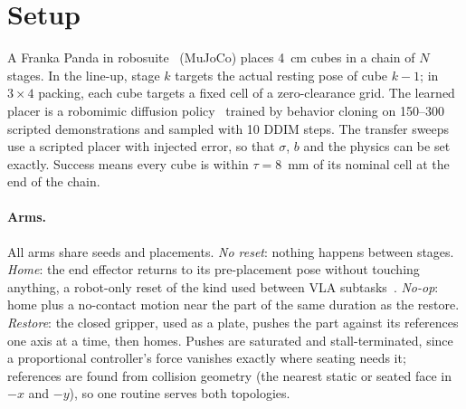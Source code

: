 \documentclass{article}
\begin{document}
\section{Setup}
\label{sec:setup}
A Franka Panda in robosuite~\citep{robosuite} (MuJoCo) places 4~cm cubes in a chain of $N$ stages. In the line-up,
stage $k$ targets the actual resting pose of cube $k-1$; in $3\times4$ packing, each cube targets a fixed cell of a
zero-clearance grid. The learned placer is a robomimic diffusion policy~\citep{robomimic,diffusionpolicy} trained by
behavior cloning on 150--300 scripted demonstrations and sampled with 10 DDIM steps. The transfer sweeps use a
scripted placer with injected error, so that $\sigma$, $b$ and the physics can be set exactly. Success means every
cube is within $\tau=8$~mm of its nominal cell at the end of the chain.

\paragraph{Arms.} All arms share seeds and placements. \textit{No reset}: nothing happens between stages.
\textit{Home}: the end effector returns to its pre-placement pose without touching anything, a robot-only reset of the
kind used between VLA subtasks~\citep{baton2026}. \textit{No-op}: home plus a no-contact motion near the part of the
same duration as the restore. \textit{Restore}: the closed gripper, used as a plate, pushes the part against its
references one axis at a time, then homes. Pushes are saturated and stall-terminated, since a proportional
controller's force vanishes exactly where seating needs it; references are found from collision geometry (the
nearest static or seated face in $-x$ and $-y$), so one routine serves both topologies.
\end{document}
